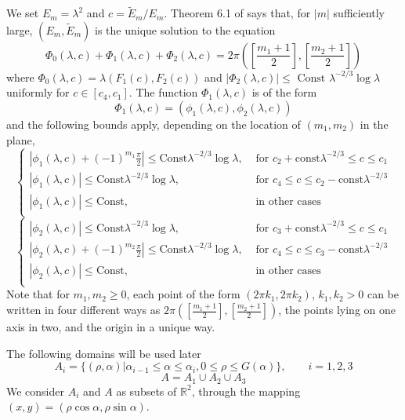 \documentclass[12pt]{amsart}
\numberwithin{equation}{subsection}
\theoremstyle{definition}
\theoremstyle{plain}
\begin{document}
We set $E_m = \lambda^2$ and $c = \widetilde{E}_m / E_m$.
Theorem 6.1 of \cite{1} says that, for $|m|$ sufficiently large, $(E_{m}, \widetilde{E}_{m})$ is the unique solution to the equation
\begin{equation}
\label{eq1}
\Phi_0(\lambda,c) + \Phi_1(\lambda,c) + \Phi_2(\lambda,c) = 2 \pi \left( \left[ \frac{m_1+1}{2} \right],\left[ \frac{m_2+1}{2}\right] \right)
\end{equation}
where $\Phi_0(\lambda,c) = \lambda(F_1(c), F_2(c))$ and $|\Phi_2(\lambda,c)| \leq \text{ Const }  \lambda^{-2/3} \log \lambda$ uniformly for $c \in [c_4, c_1]$.
The function $\Phi_1(\lambda,c)$ is of the form
\[
\Phi_1(\lambda,c) = (\phi_1(\lambda,c), \phi_2(\lambda,c))
\]
and the following bounds apply, depending on the location of $(m_1,m_2)$ in the plane,
\[
\begin{cases}
|\phi_1(\lambda,c) + (-1)^{m_1}\frac{\pi}{2}| \leq \text{Const}  \lambda^{-2/3} \log \lambda ,& \text{  for  } c_2 + \text{const} \lambda^{-2/3} \leq c \leq c_1\\
|\phi_1(\lambda,c)| \leq \text{Const}  \lambda^{-2/3} \log \lambda ,& \text{  for  } c_4 \leq c \leq c_2 - \text{const} \lambda^{-2/3}\\
|\phi_1(\lambda,c)| \leq \text{Const}  ,& \text{  in other cases}\\
\end{cases}
\]
\[
\begin{cases}
|\phi_2(\lambda,c)| \leq \text{Const}  \lambda^{-2/3} \log \lambda ,& \text{  for  } c_3
+ \text{const} \lambda^{-2/3} \leq c \leq c_1\\
|\phi_2(\lambda,c) + (-1)^{m_2}\frac{\pi}{2}| \leq \text{Const}  \lambda^{-2/3} \log \lambda ,& \text{  for  } c_4 \leq c \leq c_3 - \text{const} \lambda^{-2/3}\\
|\phi_2(\lambda,c)| \leq \text{Const} ,& \text{  in other cases}\\
\end{cases}
\]
Note that for $m_1, m_2 \geq 0$, each point of the form $(2 \pi k_1, 2 \pi k_2)$, $k_1, k_2 > 0$ can be written in four different ways as $2 \pi \left( \left[ \frac{m_1+1}{2} \right],\left[ \frac{m_2+1}{2}\right] \right)$,
the points lying on one axis in two, and the origin in a unique way.

The following domains will be used later
\[
A_i = \{ (\rho, \alpha) | \alpha_{i-1} \leq \alpha \leq \alpha_{i}, 0 \leq \rho \leq G(\alpha) \},\qquad i = 1,2,3
\]
\[
A = A_1 \cup A_2 \cup A_3
\]
We consider $A_i$ and $A$ as subsets of $\mathbb{R}^2$, through the mapping $(x,y)=(\rho \cos \alpha,\rho \sin \alpha)$.
\end{document}
